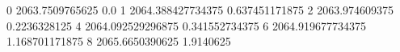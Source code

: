 0 2063.7509765625 0.0
1 2064.388427734375 0.637451171875
2 2063.974609375 0.2236328125
4 2064.092529296875 0.341552734375
6 2064.919677734375 1.168701171875
8 2065.6650390625 1.9140625
